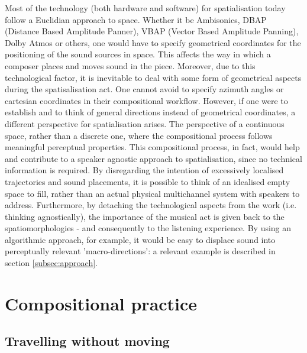 \documentclass{article}
\begin{document}
 Most of the technology (both hardware and software) for spatialisation today follow a Euclidian approach to space. Whether it be Ambisonics, DBAP (Distance Based Amplitude Panner), VBAP (Vector Based Amplitude Panning), Dolby Atmos or others, one would have to specify geometrical coordinates for the positioning of the sound sources in space. This affects the way in which a composer places and moves sound in the piece. Moreover, due to this technological factor, it is inevitable to deal with some form of geometrical aspects during the spatisalisation act. One cannot avoid to specify azimuth angles or cartesian coordinates in their compositional workflow. However, if one were to establish and to think of general directions instead of geometrical coordinates, a different perspective for spatialisation arises. The perspective of a continuous space, rather than a discrete one, where the compositional process follows meaningful perceptual properties. This compositional process, in fact, would help and contribute to a speaker agnostic approach to spatialisation, since no technical information is required. By disregarding the intention of excessively localised trajectories and sound placements, it is possible to think of an idealised empty space to fill, rather than an actual physical multichannel system with speakers to address. Furthermore, by detaching the technological aspects from the work (i.e. thinking agnostically), the importance of the musical act is given back to the spatiomorphologies - and consequently to the listening experience. By using an algorithmic approach, for example, it would be easy to displace sound into perceptually relevant 'macro-directions': a relevant example is described in section \ref{subsec:approach}.
 
 \section{Compositional practice}
	\subsection{Travelling without moving}
        \label{sec:twm}
\end{document}

